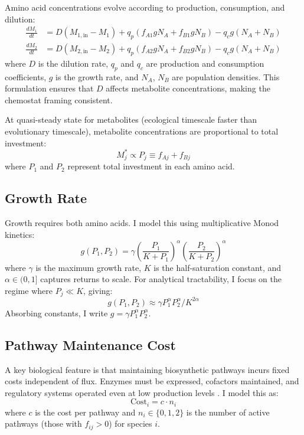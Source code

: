 \documentclass[11pt]{article}
\theoremstyle{definition}
\newcommand{\dd}[2]{\frac{d#1}{d#2}}
\begin{document}
Amino acid concentrations evolve according to production, consumption, and dilution:
\begin{align}
\dd{M_1}{t} &= D(M_{1,\text{in}} - M_1) + q_p(f_{A1} g N_A + f_{B1} g N_B) - q_c g (N_A + N_B) \label{eq:M1}\\
\dd{M_2}{t} &= D(M_{2,\text{in}} - M_2) + q_p(f_{A2} g N_A + f_{B2} g N_B) - q_c g (N_A + N_B) \label{eq:M2}
\end{align}
where $D$ is the dilution rate, $q_p$ and $q_c$ are production and consumption coefficients, $g$ is the growth rate, and $N_A$, $N_B$ are population densities. This formulation ensures that $D$ affects metabolite concentrations, making the chemostat framing consistent.

At quasi-steady state for metabolites (ecological timescale faster than evolutionary timescale), metabolite concentrations are proportional to total investment:
\begin{equation}
M_j^* \propto P_j \equiv f_{Aj} + f_{Bj}
\label{eq:Mss}
\end{equation}
where $P_1$ and $P_2$ represent total investment in each amino acid.

\subsection{Growth Rate}

Growth requires both amino acids. I model this using multiplicative Monod kinetics:
\begin{equation}
g(P_1, P_2) = \gamma \left(\frac{P_1}{K + P_1}\right)^\alpha \left(\frac{P_2}{K + P_2}\right)^\alpha
\label{eq:growth}
\end{equation}
where $\gamma$ is the maximum growth rate, $K$ is the half-saturation constant, and $\alpha \in (0,1]$ captures returns to scale. For analytical tractability, I focus on the regime where $P_j \ll K$, giving:
\begin{equation}
g(P_1, P_2) \approx \gamma P_1^\alpha P_2^\alpha / K^{2\alpha}
\label{eq:growth_approx}
\end{equation}
Absorbing constants, I write $g = \gamma P_1^\alpha P_2^\alpha$.

\subsection{Pathway Maintenance Cost}

A key biological feature is that maintaining biosynthetic pathways incurs fixed costs independent of flux. Enzymes must be expressed, cofactors maintained, and regulatory systems operated even at low production levels \citep{lynch2015evolutionary}. I model this as:
\begin{equation}
\text{Cost}_i = c \cdot n_i
\label{eq:pathway_cost}
\end{equation}
where $c$ is the cost per pathway and $n_i \in \{0, 1, 2\}$ is the number of active pathways (those with $f_{ij} > 0$) for species $i$.
\end{document}
